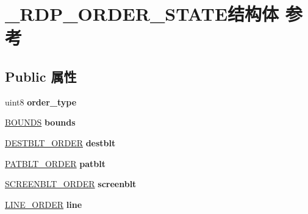 \hypertarget{struct___r_d_p___o_r_d_e_r___s_t_a_t_e}{}\section{\+\_\+\+R\+D\+P\+\_\+\+O\+R\+D\+E\+R\+\_\+\+S\+T\+A\+T\+E结构体 参考}
\label{struct___r_d_p___o_r_d_e_r___s_t_a_t_e}
\subsection*{Public 属性}
\begin{DoxyCompactItemize}
\item 
\mbox{\label{struct___r_d_p___o_r_d_e_r___s_t_a_t_e_ad985fad9376ecda882baafaa4712c961}} 
uint8 {\bfseries order\+\_\+type}
\item 
\mbox{\label{struct___r_d_p___o_r_d_e_r___s_t_a_t_e_a233977f588dfd25017b37dfbbd9d21eb}} 
\hyperlink{struct___b_o_u_n_d_s}{B\+O\+U\+N\+DS} {\bfseries bounds}
\item 
\mbox{\label{struct___r_d_p___o_r_d_e_r___s_t_a_t_e_a53fbd1661e33fa3c16744d10a8643e77}} 
\hyperlink{struct___d_e_s_t_b_l_t___o_r_d_e_r}{D\+E\+S\+T\+B\+L\+T\+\_\+\+O\+R\+D\+ER} {\bfseries destblt}
\item 
\mbox{\label{struct___r_d_p___o_r_d_e_r___s_t_a_t_e_a792bc573cdb2dbc24af8cc27ea5bd883}} 
\hyperlink{struct___p_a_t_b_l_t___o_r_d_e_r}{P\+A\+T\+B\+L\+T\+\_\+\+O\+R\+D\+ER} {\bfseries patblt}
\item 
\mbox{\label{struct___r_d_p___o_r_d_e_r___s_t_a_t_e_a8510a90533e11c5b098bacfc87c72d4b}} 
\hyperlink{struct___s_c_r_e_e_n_b_l_t___o_r_d_e_r}{S\+C\+R\+E\+E\+N\+B\+L\+T\+\_\+\+O\+R\+D\+ER} {\bfseries screenblt}
\item 
\mbox{\label{struct___r_d_p___o_r_d_e_r___s_t_a_t_e_a6447a35c3c0b7b05ce34fe534d14ed5d}} 
\hyperlink{struct___l_i_n_e___o_r_d_e_r}{L\+I\+N\+E\+\_\+\+O\+R\+D\+ER} {\bfseries line}
\item 

\end{DoxyCompactItemize}
